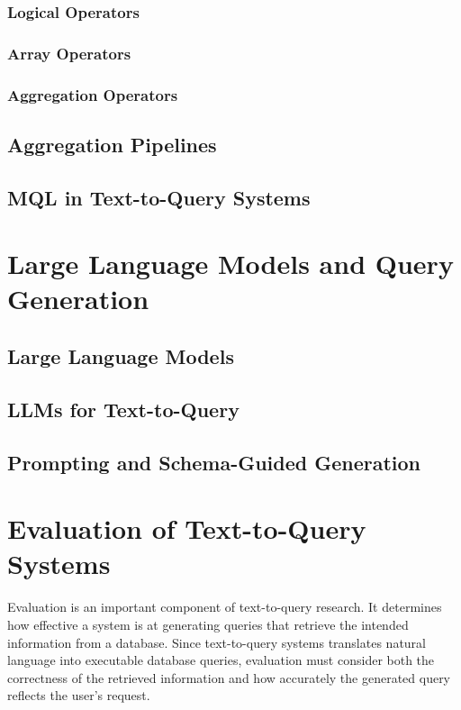 \subsubsection{Logical Operators}


\subsubsection{Array Operators}


\subsubsection{Aggregation Operators}


\subsection{Aggregation Pipelines}


\subsection{MQL in Text-to-Query Systems}



\section{Large Language Models and Query Generation}
\subsection{Large Language Models}
\subsection{LLMs for Text-to-Query}
\subsection{Prompting and Schema-Guided Generation}

\section{Evaluation of Text-to-Query Systems}

Evaluation is an important component of text-to-query research. It determines how effective a system is at generating queries that retrieve the intended information from a database. Since text-to-query systems translates natural language into executable database queries, evaluation must consider both the correctness of the retrieved information and how accurately the generated query reflects the user's request. 

